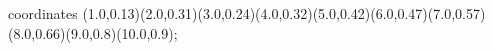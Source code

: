 					coordinates { (1.0,0.13)(2.0,0.31)(3.0,0.24)(4.0,0.32)(5.0,0.42)(6.0,0.47)(7.0,0.57)(8.0,0.66)(9.0,0.8)(10.0,0.9)};